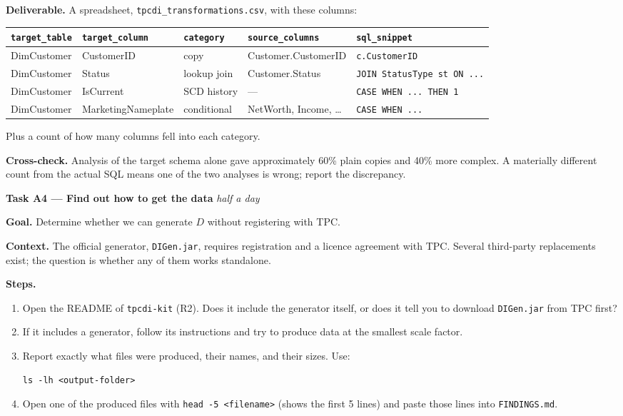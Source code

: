 \documentclass[11pt,a4paper]{article}
\newcommand{\code}[1]{\texttt{\small #1}}
\begin{document}
\textbf{Deliverable.} A spreadsheet, \code{tpcdi\_transformations.csv}, with these columns:

\begin{center}\small
\begin{tabular}{@{}lllll@{}}
\toprule
\code{target\_table} & \code{target\_column} & \code{category} & \code{source\_columns} & \code{sql\_snippet} \\
\midrule
DimCustomer & CustomerID & copy & Customer.CustomerID & \code{c.CustomerID} \\
DimCustomer & Status & lookup join & Customer.Status & \code{JOIN StatusType st ON ...} \\
DimCustomer & IsCurrent & SCD history & --- & \code{CASE WHEN ... THEN 1} \\
DimCustomer & MarketingNameplate & conditional & NetWorth, Income, \ldots & \code{CASE WHEN ...} \\
\bottomrule
\end{tabular}
\end{center}

Plus a count of how many columns fell into each category.

\begin{notebox}
\textbf{Cross-check.} Analysis of the target schema alone gave approximately 60\% plain
copies and 40\% more complex. A materially different count from the actual SQL means one of
the two analyses is wrong; report the discrepancy.
\end{notebox}

\vspace{4pt}
\begin{taskbox}
\textbf{Task A4 --- Find out how to get the data} \hfill \emph{half a day}
\end{taskbox}

\textbf{Goal.} Determine whether we can generate $D$ without registering with TPC.

\textbf{Context.} The official generator, \code{DIGen.jar}, requires registration and a
licence agreement with TPC. Several third-party replacements exist; the question is whether
any of them works standalone.

\textbf{Steps.}

\begin{enumerate}
\item Open the README of \code{tpcdi-kit} (R2). Does it include the generator itself, or
  does it tell you to download \code{DIGen.jar} from TPC first?
\item If it includes a generator, follow its instructions and try to produce data at the
  smallest scale factor.
\item Report exactly what files were produced, their names, and their sizes. Use:
\begin{lstlisting}[style=sh]
ls -lh <output-folder>
\end{lstlisting}
\item Open one of the produced files with \code{head -5 \textless filename\textgreater}
  (shows the first 5 lines) and paste those lines into \code{FINDINGS.md}.
\end{enumerate}
\end{document}
